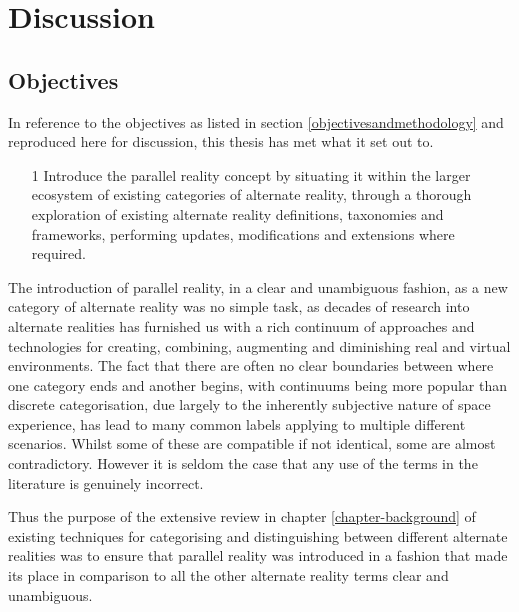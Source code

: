 
\section{Discussion}


\subsection{Objectives}

In reference to the objectives as listed in section \ref{objectivesandmethodology} and reproduced here for discussion, this thesis has met what it set out to.

\begin{enumerate}
	\item[1] Introduce the parallel reality concept by situating it within the larger ecosystem of existing categories of alternate reality, through a thorough exploration of existing alternate reality definitions, taxonomies and frameworks, performing updates, modifications and extensions where required.
\end{enumerate}

The introduction of parallel reality, in a clear and unambiguous fashion, as a new category of alternate reality was no simple task, as decades of research into alternate realities has furnished us with a rich continuum of approaches and technologies for creating, combining, augmenting and diminishing real and virtual environments. The fact that there are often no clear boundaries between where one category ends and another begins, with continuums being more popular than discrete categorisation, due largely to the inherently subjective nature of space experience, has lead to many common labels applying to multiple different scenarios. Whilst some of these are compatible if not identical, some are almost contradictory. However it is seldom the case that any use of the terms in the literature is genuinely incorrect.

Thus the purpose of the extensive review in chapter \ref{chapter-background} of existing techniques for categorising and distinguishing between different alternate realities was to ensure that parallel reality was introduced in a fashion that made its place in comparison to all the other alternate reality terms clear and unambiguous.

